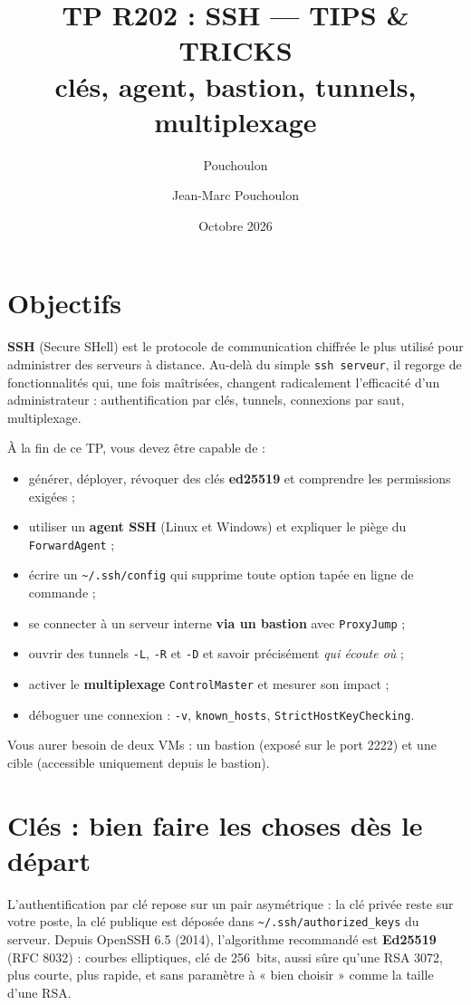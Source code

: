 \documentclass[a4paper,10pt]{exam}
\author{Pouchoulon}
\author{Jean-Marc Pouchoulon}
\title{TP R202 : SSH --- TIPS \& TRICKS\\{\small clés, agent, bastion, tunnels, multiplexage}}
\date{Octobre 2026}
\begin{document}
\maketitle

\section{Objectifs}

\textbf{SSH} (Secure SHell) est le protocole de communication chiffrée le plus utilisé pour
administrer des serveurs à distance. Au-delà du simple \texttt{ssh serveur}, il regorge de
fonctionnalités qui, une fois maîtrisées, changent radicalement l'efficacité d'un administrateur :
authentification par clés, tunnels, connexions par saut, multiplexage.

À la fin de ce TP, vous devez être capable de :
\begin{itemize}
  \item générer, déployer, révoquer des clés \textbf{ed25519} et comprendre les permissions exigées ;
  \item utiliser un \textbf{agent SSH} (Linux et Windows) et expliquer le piège du \texttt{ForwardAgent} ;
  \item écrire un \texttt{\textasciitilde/.ssh/config} qui supprime toute option tapée en ligne de commande ;
  \item se connecter à un serveur interne \textbf{via un bastion} avec \texttt{ProxyJump} ;
  \item ouvrir des tunnels \texttt{-L}, \texttt{-R} et \texttt{-D} et savoir précisément \emph{qui écoute où} ;
  \item activer le \textbf{multiplexage} \texttt{ControlMaster} et mesurer son impact ;
  \item déboguer une connexion : \texttt{-v}, \texttt{known\_hosts}, \texttt{StrictHostKeyChecking}.
\end{itemize}
Vous aurer besoin de deux VMs : un bastion (exposé sur le port 2222) 
et une cible (accessible uniquement depuis le bastion).

\section{Clés : bien faire les choses dès le départ}

L'authentification par clé repose sur un pair asymétrique : la clé privée reste sur votre poste,
la clé publique est déposée dans \texttt{\textasciitilde/.ssh/authorized\_keys} du serveur.
Depuis OpenSSH 6.5 (2014), l'algorithme recommandé est \textbf{Ed25519} (RFC 8032) :
courbes elliptiques, clé de 256~bits, aussi sûre qu'une RSA 3072, plus courte, plus rapide,
et sans paramètre à « bien choisir » comme la taille d'une RSA.
\end{document}
